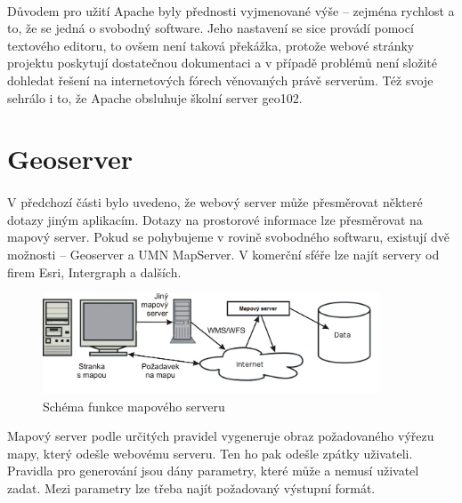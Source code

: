 \documentclass[11pt,a4paper,titlepage,oneside]{book}
\begin{document}
		\paragraph{} Důvodem pro užití Apache byly přednosti vyjmenované výše -- zejména rychlost a to, že se jedná o svobodný software. Jeho nastavení se sice provádí pomocí textového editoru, to ovšem není taková překážka, protože webové stránky projektu poskytují dostatečnou dokumentaci a v případě problémů není složité dohledat řešení na internetových fórech věnovaných právě serverům. Též svoje sehrálo i to, že Apache obsluhuje školní server geo102.

	\section{Geoserver}
		\paragraph{} V předchozí části bylo uvedeno, že webový server může přesměrovat některé dotazy jiným aplikacím. Dotazy na prostorové informace lze přesměrovat na mapový server. Pokud se pohybujeme v rovině svobodného softwaru, existují dvě možnosti -- Geoserver a UMN MapServer. V komerční sféře lze najít servery od firem Esri, Intergraph a dalších. 
		\begin{figure}[!h]
			\begin{center}
				\includegraphics[width=10cm]{obrazky/mapserver.png}
				\caption{Schéma funkce mapového serveru}
				\label{fig:server_schema}
			\end{center}
		\end{figure}
Mapový server podle určitých pravidel vygeneruje obraz požadovaného výřezu mapy, který odešle webovému serveru. Ten ho pak odešle zpátky uživateli. Pravidla pro generování jsou dány parametry, které může a nemusí uživatel zadat. Mezi parametry lze třeba najít požadovaný výstupní formát.
\end{document}
